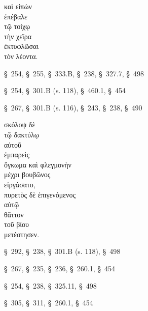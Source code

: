 

{\large
\begin{greek}
\noindent καὶ εἰπὼν \\
ἐπέβαλε \\
\tabto{2em} τῷ τοίχῳ \\
\tabto{2em} τὴν χεῖρα \\
\tabto{2em} ἐκτυφλῶσαι \\
\tabto{4em} τὸν λέοντα.\\

\end{greek}
}

\begin{description}[noitemsep]
\item[εἰπὼν] §~254, §~255, §~333.B, §~238, §~327.7, §~498
\item[ἐπέβαλε] §~254, §~301.B (s. 118), §~460.1, §~454
\item[ἐκτυφλῶσαι] §~267, §~301.B (s. 116), §~243, §~238, §~490%
\end{description}



{\large
\begin{greek}
\noindent σκόλοψ δὲ \\
\tabto{2em} τῷ δακτύλῳ \\
\tabto{4em} αὐτοῦ \\
ἐμπαρεὶς \\
ὄγκωμα καὶ φλεγμονὴν \\
\tabto{2em} μέχρι βουβῶνος \\
εἰργάσατο, \\
πυρετὸς δὲ ἐπιγενόμενος \\
\tabto{2em} αὐτῷ \\
θᾶττον \\
\tabto{2em} τοῦ βίου \\
μετέστησεν.\\

\end{greek}
}

\begin{description}[noitemsep]
\item[ἐμπαρεὶς] §~292, §~238, §~301.B (s. 118), §~498
\item[εἰργάσατο] §~267, §~235, §~236, §~260.1, §~454
\item[ἐπιγενόμενος] §~254, §~238, §~325.11, §~498
\item[μετέστησεν] §~305, §~311, §~260.1, §~454

\end{description}

